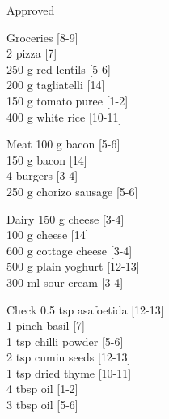 \begin{menu}{Approved}
\begin{shoppinglist}{Groceries}
        {\scriptsize[8-9]}\\
      2  pizza 
        {\scriptsize[7]}\\
      250 g red lentils 
        {\scriptsize[5-6]}\\
      200 g tagliatelli 
        {\scriptsize[14]}\\
      150 g tomato puree 
        {\scriptsize[1-2]}\\
      400 g white rice 
        {\scriptsize[10-11]}\\
      \end{shoppinglist}%
      \par\vfil %
      \begin{shoppinglist}{Meat}
      100 g bacon 
        {\scriptsize[5-6]}\\
      150 g bacon 
        {\scriptsize[14]}\\
      4  burgers 
        {\scriptsize[3-4]}\\
      250 g chorizo sausage 
        {\scriptsize[5-6]}\\
      \end{shoppinglist}%
      \begin{shoppinglist}{Dairy}
      150 g cheese 
        {\scriptsize[3-4]}\\
      100 g cheese 
        {\scriptsize[14]}\\
      600 g cottage cheese 
        {\scriptsize[3-4]}\\
      500 g plain yoghurt 
        {\scriptsize[12-13]}\\
      300 ml sour cream 
        {\scriptsize[3-4]}\\
      \end{shoppinglist}%
      \par\vfil %
      \vfil\clearpage %
      \begin{shoppinglist}{Check}
      0.5 tsp asafoetida 
        {\scriptsize[12-13]}\\
      1 pinch basil 
        {\scriptsize[7]}\\
      1 tsp chilli powder 
        {\scriptsize[5-6]}\\
      2 tsp cumin seeds 
        {\scriptsize[12-13]}\\
      1 tsp dried thyme 
        {\scriptsize[10-11]}\\
      4 tbsp oil 
        {\scriptsize[1-2]}\\
      3 tbsp oil 
        {\scriptsize[5-6]}\\

\end{shoppinglist}
\end{menu}
